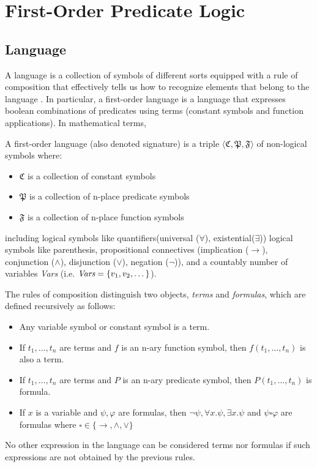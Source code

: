 \section{First-Order Predicate Logic}

\subsection{Language}
A language is a collection of symbols of different sorts equipped with a rule of composition that effectively tells us how to recognize elements that belong to the language \cite{DBLP:books/daglib/0080654}. In particular, a first-order language is a language that expresses boolean combinations of predicates using terms (constant symbols and function applications). In mathematical terms, 

\begin{definition}
 A first-order language (also denoted signature) is a triple $\langle \mathfrak{C}, \mathfrak{P}, \mathfrak{F} \rangle$ of non-logical symbols where:

\begin{itemize}
  \item $\mathfrak{C}$ is a collection of constant symbols
  \item $\mathfrak{P}$ is a collection of n-place predicate symbols
  \item $\mathfrak{F}$ is a collection of n-place function symbols
\end{itemize}

including logical symbols like quantifiers(universal ($\forall$), existential($\exists$)) logical symbols like parenthesis, propositional connectives (implication ($\rightarrow$), conjunction ($\land$), disjunction ($\lor$), negation ($\neg$)), and a countably number of variables \emph{Vars} (i.e. $\emph{Vars} = \{v_1, v_2, \dots\}$).

The rules of composition distinguish two objects, \emph{terms} and \emph{formulas}, which are defined recursively as follows:

\begin{itemize}
  \item Any variable symbol or constant symbol is a term.
  \item If $t_1, \dots, t_n$ are terms and $f$ is an n-ary function symbol, then $f(t_1, \dots, t_n)$ is also a term.
  \item If $t_1, \dots, t_n$ are terms and $P$ is an n-ary predicate symbol, then $P(t_1, \dots, t_n)$ is formula.
  \item If $x$ is a variable and $\psi, \varphi$ are formulas, then $\neg \psi, \forall x . \psi, \exists x . \psi$ and $\psi \square \varphi$ are formulas where $\square \in \{\rightarrow, \land, \lor\}$
\end{itemize}
No other expression in the language can be considered terms nor formulas if such expressions are not obtained by the previous rules.
\end{definition}


